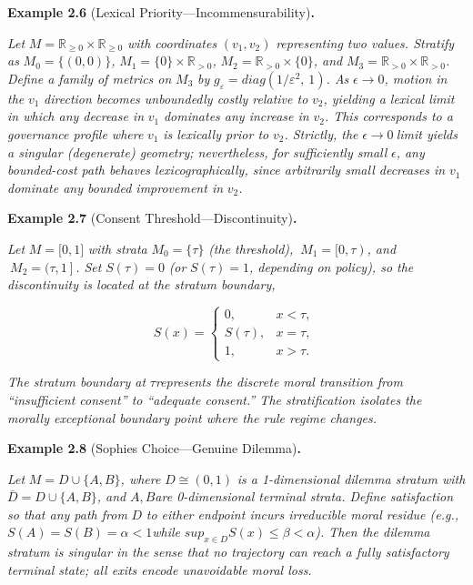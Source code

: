 \documentclass[12pt]{article}
\theoremstyle{plain}
\theoremstyle{definition}
\theoremstyle{remark}
\begin{document}
\textbf{Example 2.6} (Lexical Priority---Incommensurability)\textbf{.}

\emph{Let} \(M = \mathbb{R}_{\geq 0} \times \mathbb{R}_{\geq 0}\)
\emph{with coordinates} \(\left( v_{1},v_{2} \right)\)
\emph{representing two values. Stratify as}
\(M_{0} = \{(0,0)\}\)\emph{,}
\(M_{1} = \{ 0\} \times \mathbb{R}_{> 0}\)\emph{,}
\(M_{2} = \mathbb{R}_{> 0} \times \{ 0\}\)\emph{, and}
\(M_{3} = \mathbb{R}_{> 0} \times \mathbb{R}_{> 0}\)\emph{. Define a
family of metrics on} \(M_{3}\) \emph{by}
\(g_{\varepsilon} = diag(1/\varepsilon^{2},\text{ }1)\)\emph{. As}
\(\epsilon \rightarrow 0\)\emph{, motion in the} \(v_{1}\)
\emph{direction becomes unboundedly costly relative to} \(v_{2}\)\emph{,
yielding a lexical limit in which any decrease in} \(v_{1}\)
\emph{dominates any increase in} \(v_{2}\)\emph{. This corresponds to a
governance profile where} \(v_{1}\) \emph{is lexically prior to}
\(v_{2}\)\emph{. Strictly, the} \(\epsilon \rightarrow 0\ \)\emph{limit
yields a singular (degenerate) geometry; nevertheless, for sufficiently
small} \(\epsilon\)\emph{, any bounded-cost path behaves
lexicographically, since arbitrarily small decreases in} \(v_{1}\)
\emph{dominate any bounded improvement in} \(v_{2}\)\emph{.}

\textbf{Example 2.7} (Consent Threshold---Discontinuity)\textbf{.}

\emph{Let} \(M = \lbrack 0,1\rbrack\) \emph{with strata}
\(M_{0} = \{\tau\}\) \emph{(the threshold),}
\(\left. \ M_{1} = \lbrack 0,\tau \right)\)\emph{, and}
\(\left. \ M_{2} = (\tau,1 \right\rbrack\)\emph{. Set} \(S(\tau) = 0\)
\emph{(or} \(S(\tau) = 1\)\emph{, depending on policy), so the
discontinuity is located at the stratum boundary,}

\[S(x) = \left\{ \begin{matrix}
0, & x < \tau, \\
S(\tau), & x = \tau, \\
1, & x > \tau.
\end{matrix} \right.\ \]

\emph{The stratum boundary at} \(\tau\)\emph{represents the discrete
moral transition from ``insufficient consent'' to ``adequate consent.''
The stratification isolates the morally exceptional boundary point where
the rule regime changes.}

\textbf{Example 2.8} (Sophie\textquotesingle s Choice---Genuine
Dilemma)\textbf{.}

\emph{Let} \(M = D \cup \{ A,B\}\)\emph{, where} \(D \cong (0,1)\)
\emph{is a 1-dimensional dilemma stratum with}
\(\bar{D} = D \cup \{ A,B\}\)\emph{, and} \(A,B\)\emph{are 0-dimensional
terminal strata. Define satisfaction so that any path from} \(D\)
\emph{to either endpoint incurs irreducible moral residue (e.g.,}
\(S(A) = S(B) = \alpha < 1\)\emph{while}
\({sup}_{x \in D}S(x) \leq \beta < \alpha\)\emph{). Then the dilemma
stratum is singular in the sense that no trajectory can reach a fully
satisfactory terminal state; all exits encode unavoidable moral loss.}
\end{document}
